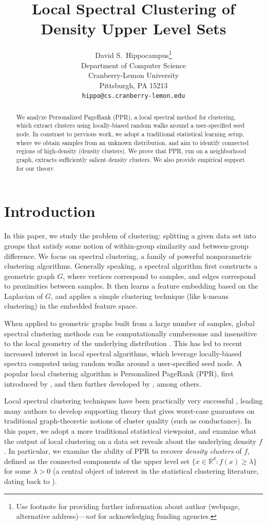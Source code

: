 \documentclass{article}
\title{Local Spectral Clustering of Density Upper Level Sets}
\author{%
  David S.~Hippocampus\thanks{Use footnote for providing further information
    about author (webpage, alternative address)---\emph{not} for acknowledging
    funding agencies.} \\
  Department of Computer Science\\
  Cranberry-Lemon University\\
  Pittsburgh, PA 15213 \\
  \texttt{hippo@cs.cranberry-lemon.edu} \\
}
\newcommand{\Reals}{\mathbb{R}}
\newcommand{\Rd}{\Reals^d}
\newcommand{\1}{\mathbf{1}}
\theoremstyle{aldenthm}
\theoremstyle{aldenrmrk}
\begin{document}
\maketitle

\begin{abstract}
We analyze Personalized PageRank (PPR), a local spectral method for clustering,
which extract clusters using locally-biased random walks around a user-specified
seed node.  In constrast to pervious work, we adopt a traditional statistical
learning setup, where we obtain samples from an unknown distribution, and aim to
identify connected regions of high-density (density clusters).  We prove that
PPR, run on a neighborhood graph, extracts sufficiently salient density
clusters. We also provide empirical support for our theory.
\end{abstract}

\section{Introduction}
\label{sec: introduction}

In this paper, we study the problem of clustering: splitting a given data set
into groups that satisfy some notion of within-group similarity and
between-group difference.  We focus on spectral clustering, a family of powerful
nonparametric clustering algorithms.  Generally speaking, a spectral algorithm
first constructs a geometric graph $G$, where vertices correspond to samples,
and edges correspond to proximities between samples. It then learns a feature
embedding based on the Laplacian of $G$, and applies a simple clustering
technique (like k-means clustering) in the embedded feature space.

When applied to geometric graphs built from a large number of samples,
global spectral clustering methods can be computationally cumbersome and   
insensitive to the local geometry of the underlying distribution
\citep{leskovec2010,mahoney2012}.  This has led to recent increased interest in
local spectral algorithms, which leverage locally-biased spectra computed using
random walks around a user-specified seed node.  A popular local clustering
algorithm is Personalized PageRank (PPR), first introduced by
\citet{haveliwala2003}, and then further developed by
\citep{spielman2011,spielman2014,andersen2006,mahoney2012,zhu2013},
among others.  

Local spectral clustering techniques have been practically very successful
\citep{leskovec2010,andersen2012,gleich2012,mahoney2012,wu2012}, leading 
many authors to develop supporting theory
\citep{spielman2013,andersen2009,gharan2012,zhu2013} that gives worst-case
guarantees on traditional graph-theoretic notions of cluster quality (such as
conductance).  In this paper, we adopt a more traditional statistical viewpoint,
and examine what the output of local clustering on a data set reveals about the
underlying density $f$.  In particular, we examine the ability of PPR to recover
\emph{density clusters} of $f$, defined as the connected components of
the upper level set $\{x \in \Rd : f(x) \geq \lambda\}$ for some $\lambda > 0$
(a central object of interest in the statistical clustering literature, dating
back to \citet{hartigan1981}).   
\end{document}
